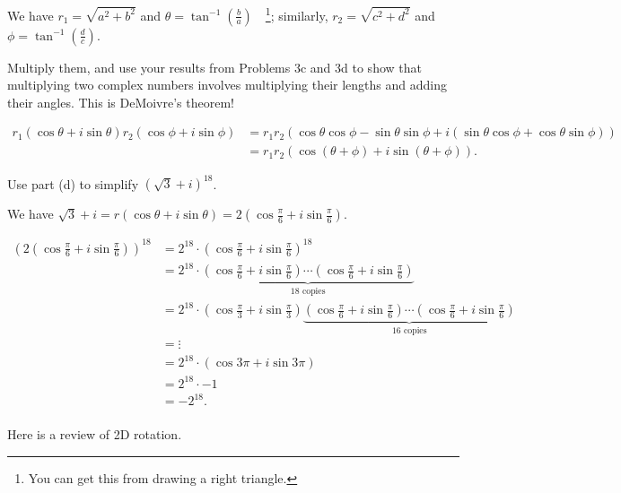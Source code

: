 \documentclass[../gatm_answers.tex]{subfiles}
\begin{document}
We have $r_1=\sqrt{a^2+b^2}$ and $\theta=\tan^{-1}\left(\frac{b}{a}\right)\quad$\footnote{You can get this from drawing a right triangle.}; similarly, $r_2=\sqrt{c^2+d^2}$ and $\phi=\tan^{-1}\left(\frac{d}{c}\right)$.

\begin{inner_problem}
\item Multiply them, and use your results from Problems 3c and 3d to show that multiplying two complex numbers involves multiplying their lengths and adding their angles. This is DeMoivre's theorem!
\end{inner_problem}

\begin{align*}
r_1(\cos\theta + i\sin\theta)r_2(\cos\phi + i\sin\phi) &= r_1r_2(\cos\theta\cos\phi - \sin\theta\sin\phi + i(\sin\theta\cos\phi + \cos\theta\sin\phi)) \\
&= r_1r_2(\cos(\theta+\phi) + i \sin(\theta+\phi)).
\end{align*}

\begin{inner_problem}
\item Use part (d) to simplify $(\sqrt{3}+i)^{18}$.
\end{inner_problem}

We have $\sqrt{3}+i=r(\cos\theta + i\sin\theta) = 2\left(\cos\frac{\pi}{6} + i\sin\frac{\pi}{6}\right)$.

\begin{align*}
(2\left(\cos\frac{\pi}{6} + i\sin\frac{\pi}{6}\right))^{18} &= 2^{18} \cdot \left(\cos\frac{\pi}{6} + i\sin\frac{\pi}{6}\right)^{18} \\
&= 2^{18}\cdot \underbrace{\left(\cos\frac{\pi}{6} + i\sin\frac{\pi}{6}\right)\cdots \left(\cos\frac{\pi}{6} + i\sin\frac{\pi}{6}\right)}_{18\text{ copies}} \\
&= 2^{18}\cdot \left(\cos\frac{\pi}{3} + i\sin\frac{\pi}{3}\right) \underbrace{\left(\cos\frac{\pi}{6} + i\sin\frac{\pi}{6}\right)\cdots \left(\cos\frac{\pi}{6} + i\sin\frac{\pi}{6}\right)}_{16\text{ copies}} \\
&= \vdots \\
&= 2^{18}\cdot \left(\cos 3\pi + i\sin 3\pi\right) \\
&= 2^{18}\cdot -1 \\
&= -2^{18}. \\
\end{align*}

\begin{outer_problem}
\item Here is a review of 2D rotation.
\end{outer_problem}
\end{document}
